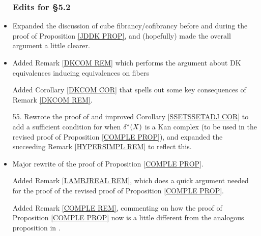 \documentclass{article}
\begin{document}
\begin{itemize}
      \subsubsection*{Edits for \S 5.2}
\item Expanded the discussion of cube fibrancy/cofibrancy before and during the proof of Proposition \ref{JDDK PROP}, and (hopefully) made the overall argument a little clearer. %
      

      
\item Added Remark \ref{DKCOM REM} which performs the argument about DK equivalences inducing equivalences on fibers
      
      Added Corollary \ref{DKCOM COR} that spells out some key consequences of Remark \ref{DKCOM REM}.

      
\item[55.] Rewrote the proof of and improved Corollary \ref{SSETSSETADJ COR} to add a sufficient condition for when $\delta^{\**}(X)$ is a Kan complex (to be used in the revised proof of Proposition \ref{COMPLE PROP}), and expanded the succeeding Remark \ref{HYPERSIMPL REM} to reflect this.
      

      
\item Major rewrite of the proof of Proposition \ref{COMPLE PROP}.
      
      Added Remark \ref{LAMBJREAL REM}, which does a quick argument needed for the proof of the revised proof of Proposition \ref{COMPLE PROP}.

      Added Remark \ref{COMPLE REM}, commenting on how the proof of Proposition \ref{COMPLE PROP} now is a little different from the analogous proposition in \cite{Rez01}.




\end{itemize}
\end{document}
